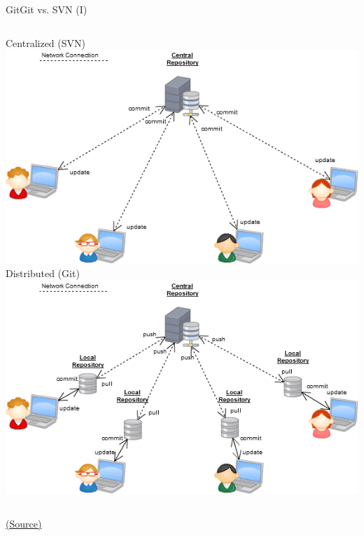 \documentclass[10pt,compress]{beamer} %
\begin{document}
\begin{frame}{Git}{Git vs. SVN (I)}
\begin{center}
\begin{columns}
	\centering Centralized (SVN)\\\smallskip
\includegraphics[width=\linewidth]{figs/centralized.png}
	\centering Distributed (Git)\\\smallskip
\includegraphics[width=\linewidth]{figs/distributed.png}
\end{columns}

\tiny \href{http://softwareengineering.stackexchange.com/questions/35074/im-a-subversion-geek-why-should-i-consider-or-not-consider-mercurial-or-git-or}{(Source)}
\end{center}
\end{frame}

\end{document}

